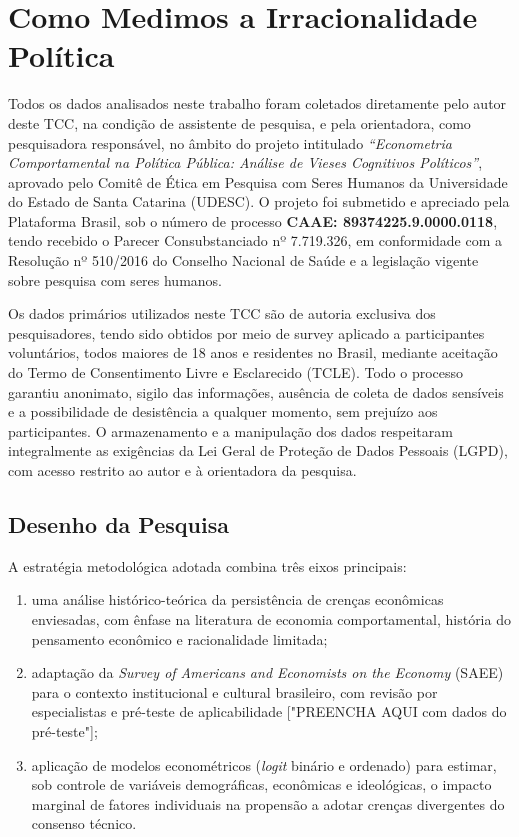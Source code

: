 \chapter{Como Medimos a Irracionalidade Política}

Todos os dados analisados neste trabalho foram coletados diretamente pelo autor deste TCC, na condição de assistente de pesquisa, e pela orientadora, como pesquisadora responsável, no âmbito do projeto intitulado \textit{“Econometria Comportamental na Política Pública: Análise de Vieses Cognitivos Políticos”}, aprovado pelo Comitê de Ética em Pesquisa com Seres Humanos da Universidade do Estado de Santa Catarina (UDESC). O projeto foi submetido e apreciado pela Plataforma Brasil, sob o número de processo \textbf{CAAE: 89374225.9.0000.0118}, tendo recebido o Parecer Consubstanciado nº 7.719.326, em conformidade com a Resolução nº 510/2016 do Conselho Nacional de Saúde e a legislação vigente sobre pesquisa com seres humanos.

Os dados primários utilizados neste TCC são de autoria exclusiva dos pesquisadores, tendo sido obtidos por meio de survey aplicado a participantes voluntários, todos maiores de 18 anos e residentes no Brasil, mediante aceitação do Termo de Consentimento Livre e Esclarecido (TCLE). Todo o processo garantiu anonimato, sigilo das informações, ausência de coleta de dados sensíveis e a possibilidade de desistência a qualquer momento, sem prejuízo aos participantes. O armazenamento e a manipulação dos dados respeitaram integralmente as exigências da Lei Geral de Proteção de Dados Pessoais (LGPD), com acesso restrito ao autor e à orientadora da pesquisa.

\section{Desenho da Pesquisa}

A estratégia metodológica adotada combina três eixos principais:
\begin{enumerate}[label=\alph*)]
    \item uma análise histórico-teórica da persistência de crenças econômicas enviesadas, com ênfase na literatura de economia comportamental, história do pensamento econômico e racionalidade limitada;
    \item adaptação da \textit{Survey of Americans and Economists on the Economy} (SAEE) para o contexto institucional e cultural brasileiro, com revisão por especialistas e pré-teste de aplicabilidade ["PREENCHA AQUI com dados do pré-teste"];
    \item aplicação de modelos econométricos (\textit{logit} binário e ordenado) para estimar, sob controle de variáveis demográficas, econômicas e ideológicas, o impacto marginal de fatores individuais na propensão a adotar crenças divergentes do consenso técnico.
\end{enumerate}

